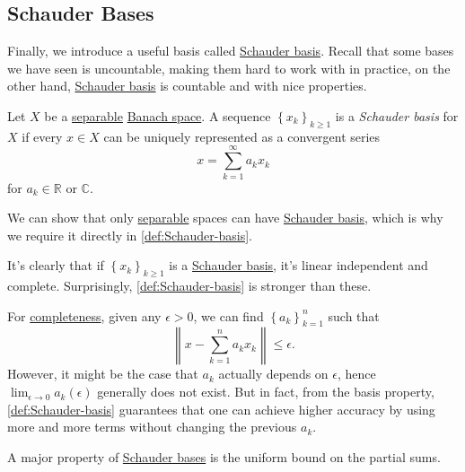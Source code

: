 \subsection{Schauder Bases}
Finally, we introduce a useful basis called \hyperref[def:Schauder-basis]{Schauder basis}. Recall that some bases we have seen is uncountable, making them hard to work with in practice, on the other hand, \hyperref[def:Schauder-basis]{Schauder basis} is countable and with nice properties.

\begin{definition}\label{def:Schauder-basis}
	Let \(X\) be a \hyperref[def:separable]{separable} \hyperref[def:Banach-space]{Banach space}. A sequence \(\left\{ x_k \right\} _{k\geq 1}\) is a \emph{Schauder basis} for \(X\) if every \(x\in X\) can be uniquely represented as a convergent series
	\[
		x = \sum_{k=1} ^{\infty} a_k x_k
	\]
	for \(a_k\in \mathbb{R} \) or \(\mathbb{C} \).
\end{definition}

\begin{remark}
	We can show that only \hyperref[def:separable]{separable} spaces can have \hyperref[def:Schauder-basis]{Schauder basis}, which is why we require it directly in \autoref{def:Schauder-basis}.
\end{remark}

It's clearly that if \(\left\{ x_k \right\} _{k\geq 1}\) is a \hyperref[def:Schauder-basis]{Schauder basis}, it's linear independent and complete. Surprisingly, \autoref{def:Schauder-basis} is stronger than these.

\begin{remark}
	For \hyperref[def:complete-system]{completeness}, given any \(\epsilon > 0\), we can find \(\left\{ a_k \right\} _{k=1}^n\) such that
	\[
		\left\lVert x - \sum_{k=1}^n a_{k} x_{k} \right\rVert \leq \epsilon.
	\]
	However, it might be the case that \(a_k\) actually depends on \(\epsilon \), hence \(\lim_{\epsilon \to 0}a_k(\epsilon )\) generally does not exist. But in fact, from the basis property, \autoref{def:Schauder-basis} guarantees that one can achieve higher accuracy by using more and more terms without changing the previous \(a_k\).
\end{remark}

A major property of \hyperref[def:Schauder-basis]{Schauder bases} is the uniform bound on the partial sums.

